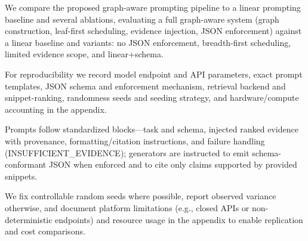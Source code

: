 We compare the proposed graph-aware prompting pipeline to a linear prompting baseline and several ablations, evaluating a full graph-aware system (graph construction, leaf-first scheduling, evidence injection, JSON enforcement) against a linear baseline and variants: no JSON enforcement, breadth-first scheduling, limited evidence scope, and linear+schema.

For reproducibility we record model endpoint and API parameters, exact prompt templates, JSON schema and enforcement mechanism, retrieval backend and snippet-ranking, randomness seeds and seeding strategy, and hardware/compute accounting in the appendix.

Prompts follow standardized blocks—task and schema, injected ranked evidence with provenance, formatting/citation instructions, and failure handling (INSUFFICIENT\_EVIDENCE); generators are instructed to emit schema-conformant JSON when enforced and to cite only claims supported by provided snippets.

We fix controllable random seeds where possible, report observed variance otherwise, and document platform limitations (e.g., closed APIs or non-deterministic endpoints) and resource usage in the appendix to enable replication and cost comparisons.